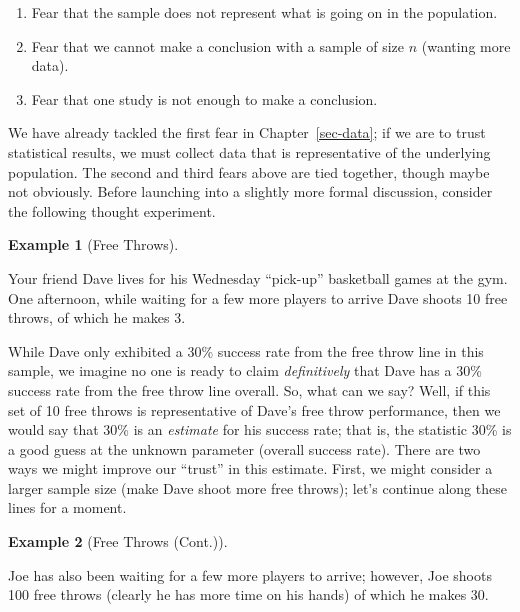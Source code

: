 \documentclass[
  letterpaper,
  DIV=11,
  numbers=noendperiod]{scrreprt}
\providecommand{\tightlist}{%
  \setlength{\itemsep}{0pt}\setlength{\parskip}{0pt}}\usepackage{longtable,booktabs,array}
\theoremstyle{definition}
\theoremstyle{definition}
\newtheorem{example}{Example}[chapter]
\theoremstyle{plain}
\theoremstyle{remark}
\begin{document}
\begin{enumerate}
\def\labelenumi{\arabic{enumi}.}
\tightlist
\item
  Fear that the sample does not represent what is going on in the
  population.
\item
  Fear that we cannot make a conclusion with a sample of size \(n\)
  (wanting more data).
\item
  Fear that one study is not enough to make a conclusion.
\end{enumerate}

We have already tackled the first fear in Chapter~\ref{sec-data}; if we
are to trust statistical results, we must collect data that is
representative of the underlying population. The second and third fears
above are tied together, though maybe not obviously. Before launching
into a slightly more formal discussion, consider the following thought
experiment.

\begin{example}[Free
Throws]\protect\hypertarget{exm-samplingdistns-free-throws}{}\label{exm-samplingdistns-free-throws}

Your friend Dave lives for his Wednesday ``pick-up'' basketball games at
the gym. One afternoon, while waiting for a few more players to arrive
Dave shoots 10 free throws, of which he makes 3.

\end{example}

While Dave only exhibited a 30\% success rate from the free throw line
in this sample, we imagine no one is ready to claim \emph{definitively}
that Dave has a 30\% success rate from the free throw line overall. So,
what can we say? Well, if this set of 10 free throws is representative
of Dave's free throw performance, then we would say that 30\% is an
\emph{estimate} for his success rate; that is, the statistic 30\% is a
good guess at the unknown parameter (overall success rate). There are
two ways we might improve our ``trust'' in this estimate. First, we
might consider a larger sample size (make Dave shoot more free throws);
let's continue along these lines for a moment.

\begin{example}[Free Throws
(Cont.)]\protect\hypertarget{exm-samplingdistns-free-throws2}{}\label{exm-samplingdistns-free-throws2}

Joe has also been waiting for a few more players to arrive; however, Joe
shoots 100 free throws (clearly he has more time on his hands) of which
he makes 30.

\end{example}
\end{document}
